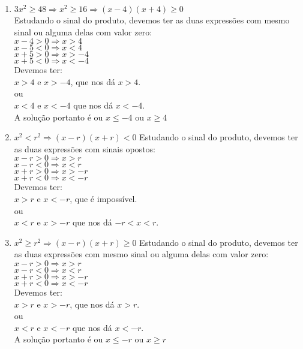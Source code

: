 \begin{enumerate}
\begin{enumerate}
			\item %
			$3x^2 \geq 48 \Rightarrow x^2 \geq 16 \Rightarrow (x - 4)(x + 4) \geq 0$\\
			Estudando o sinal do produto, devemos ter as duas expressões com mesmo sinal ou alguma delas com valor zero:\\
			$x-4 > 0 \Rightarrow x > 4$\\
			$x-5 < 0 \Rightarrow x < 4$\\
			$x+5 > 0 \Rightarrow x > -4$\\
			$x+5 < 0 \Rightarrow x < -4$\\
			Devemos ter:\\
			$x > 4$ e $x > -4$, que nos dá $x > 4$.\\
			ou\\
			$x < 4$ e $x < -4$ que nos dá $x < -4$.\\
			A solução portanto é ou $x \leq -4$ ou $x \geq 4$
			\item %
			$x^2 < r^2 \Rightarrow (x-r)(x+r) < 0$
			Estudando o sinal do produto, devemos ter as duas expressões com sinais opostos:\\
			$x-r > 0 \Rightarrow x > r$\\
			$x-r < 0 \Rightarrow x < r$\\
			$x+r > 0 \Rightarrow x > -r$\\
			$x+r < 0 \Rightarrow x < -r$\\
			Devemos ter:\\
			$x > r$ e $x < -r$, que é impossível.\\
			ou\\
			$x < r$ e $x > -r$ que nos dá $-r < x < r$.
			\item %
			$x^2 \geq r^2 \Rightarrow (x-r)(x+r) \geq 0$
			Estudando o sinal do produto, devemos ter as duas expressões com mesmo sinal ou alguma delas com valor zero:\\
			$x-r > 0 \Rightarrow x > r$\\
			$x-r < 0 \Rightarrow x < r$\\
			$x+r > 0 \Rightarrow x > -r$\\
			$x+r < 0 \Rightarrow x < -r$\\
			Devemos ter:\\
			$x > r$ e $x > -r$, que nos dá $x > r$.\\
			ou\\
			$x < r$ e $x < -r$ que nos dá $x < -r$.\\
			A solução portanto é ou $x \leq -r$ ou $x \geq r$

\end{enumerate}
\end{enumerate}
